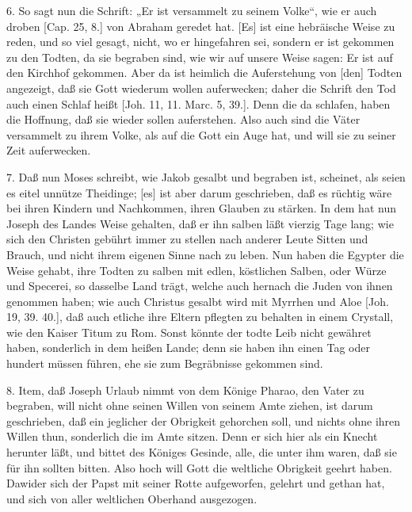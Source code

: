 6. So sagt nun die Schrift: „Er ist versammelt zu seinem Volke“, wie er auch droben [Cap. 25, 8.] von Abraham geredet hat. [Es] ist eine hebräische Weise zu reden, und so viel gesagt, nicht, wo er hingefahren sei, sondern er ist gekommen zu den Todten, da sie begraben sind, wie wir auf unsere Weise sagen: Er ist auf den Kirchhof gekommen. Aber da ist heimlich die Auferstehung von [den] Todten angezeigt, daß sie Gott wiederum wollen auferwecken; daher die Schrift den Tod auch einen Schlaf heißt [Joh. 11, 11. Marc. 5, 39.]. Denn die da schlafen, haben die Hoffnung, daß sie wieder sollen auferstehen. Also auch sind die Väter versammelt zu ihrem Volke, als auf die Gott ein Auge hat, und will sie zu seiner Zeit auferwecken.

7. Daß nun Moses schreibt, wie Jakob gesalbt und begraben ist, scheinet, als seien es eitel unnütze Theidinge; [es] ist aber darum geschrieben, daß es rüchtig wäre bei ihren Kindern und Nachkommen, ihren Glauben zu stärken. In dem hat nun Joseph des Landes Weise gehalten, daß er ihn salben läßt vierzig Tage lang; wie sich den Christen gebührt immer zu stellen nach anderer Leute Sitten und Brauch, und nicht ihrem eigenen Sinne nach zu leben. Nun haben die Egypter die Weise gehabt, ihre Todten zu salben mit edlen, köstlichen Salben, oder Würze und Specerei, so dasselbe Land trägt, welche auch hernach die Juden von ihnen genommen haben; wie auch Christus gesalbt wird mit Myrrhen und Aloe [Joh. 19, 39. 40.], daß auch etliche ihre Eltern pflegten zu behalten in einem Crystall, wie den Kaiser Titum zu Rom. Sonst könnte der todte Leib nicht gewähret haben, sonderlich in dem heißen Lande; denn sie haben ihn einen Tag oder hundert müssen führen, ehe sie zum Begräbnisse gekommen sind.

8. Item, daß Joseph Urlaub nimmt von dem Könige Pharao, den Vater zu begraben, will nicht ohne seinen Willen von seinem Amte ziehen, ist darum geschrieben, daß ein jeglicher der Obrigkeit gehorchen soll, und nichts ohne ihren Willen thun, sonderlich die im Amte sitzen. Denn er sich hier als ein Knecht herunter läßt, und bittet des Königes Gesinde, alle, die unter ihm waren, daß sie für ihn sollten bitten. Also hoch will Gott die weltliche Obrigkeit geehrt haben. Dawider sich der Papst mit seiner Rotte aufgeworfen, gelehrt und gethan hat, und sich von aller weltlichen Oberhand ausgezogen.

